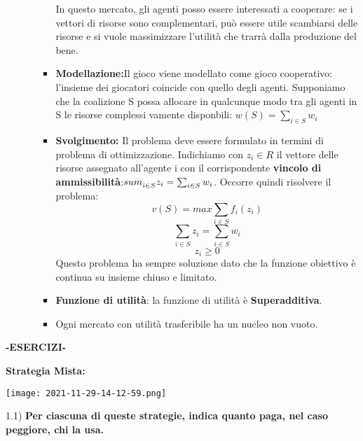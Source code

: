 \documentclass{article}
\theoremstyle{definition}
\theoremstyle{remark}
\begin{document}
\begin{itemize}
\begin{itemize}
\begin{itemize}
            In questo mercato, gli agenti posso essere interessati a cooperare: se i vettori di risorse sono complementari, può essere utile scambiarsi delle risorse e si vuole massimizzare l'utilità che trarrà dalla produzione del bene.
            \item\textbf{Modellazione:}Il gioco viene modellato come gioco cooperativo: l'insieme dei giocatori coincide con quello degli agenti. Supponiamo che la coalizione S possa allocare in qualcunque modo tra gli agenti in S le risorse complessi
            vamente disponbili: \(w(S)=\sum_{i\in S}w_i\)
            \item\textbf{Svolgimento:} Il problema deve essere formulato in termini di problema di ottimizzazione. Indichiamo con \(z_i\in R\) il vettore delle risorse assegnato all'agente i con il corrispondente \textbf{vincolo di ammissibilità}:\(\\sum_{i\in S}^{}z_i=\sum_{i\in S}w_i\).\newline
            Occorre quindi risolvere il problema:
            \begin{equation}
                v(S)=max \sum_{i\in S}f_i(z_i)
            \end{equation}
            \begin{equation}
                \sum_{i\in S}z_i=\sum_{i\in S}w_i
            \end{equation}
            \begin{equation}
                z_i\geq 0
            \end{equation}
            Questo problema ha sempre soluzione dato che la funzione obiettivo è continua su insieme chiuso e limitato.
            \item \textbf{Funzione di utilità}: la funzione di utilità è \textbf{Superadditiva}.
            \item Ogni mercato con utilità trasferibile ha un nucleo non vuoto.
        \end{itemize}
    \end{itemize}
\end{itemize}
\newpage
\begin{center}
    \textbf{-ESERCIZI-}
\end{center}
\textbf{Strategia Mista:}\newline
\begin{center}
    \texttt{[image: 2021-11-29-14-12-59.png]}
\end{center}
1.1) \textbf{Per ciascuna di queste strategie, indica quanto paga, nel caso peggiore, chi la usa.}\newline
\end{document}
